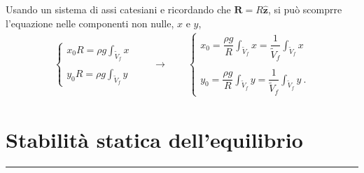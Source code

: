 \documentclass[letterpaper,10pt,italian]{jupyterBook}
\begin{document}
\sphinxAtStartPar
Usando un sistema di assi catesiani e ricordando che
\(\mathbf{R} = R \mathbf{\hat{z}}\), si può scomprre l’equazione nelle componenti
non nulle, \(x\) e \(y\),
\begin{equation*}
\begin{split}\begin{cases}
   x_0 R = \rho g \displaystyle\int_{\tilde{V}_f} x \\ \\
   y_0 R = \rho g \displaystyle\int_{\tilde{V}_f} y 
\end{cases} \qquad \rightarrow \qquad
\begin{cases}
    x_0 = \dfrac{\rho g}{R}  \displaystyle\int_{\tilde{V}_f} x  
        = \dfrac{1}{\tilde{V}_f}  \displaystyle\int_{\tilde{V}_f} x 
    \\ \\
    y_0 = \dfrac{\rho g}{R}  \displaystyle\int_{\tilde{V}_f} y 
        = \dfrac{1}{\tilde{V}_f}  \displaystyle\int_{\tilde{V}_f} y \ .
\end{cases}\end{split}
\end{equation*}

\section{Stabilità statica dell’equilibrio}
\label{\detokenize{polimi/fluidmechanics-ita/template/capitoli/01_statica/02teoria:stabilita-statica-dell-equilibrio}}

\bigskip\hrule\bigskip


\sphinxstepscope
\end{document}
